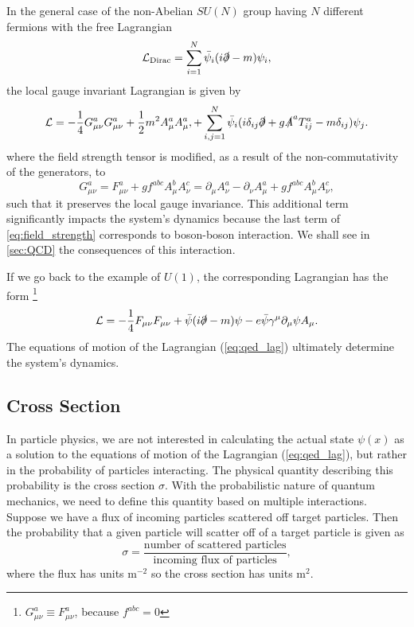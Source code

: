 In the general case of the non-Abelian $SU(N)$ group having $N$ different fermions with the free Lagrangian
\begin{equation}
    \label{eq:Dirac_N}
    \mathcal{L}_{\text{Dirac}} = \sum_{i=1}^N \bar{\psi}_i (i\slashed{\partial} - m) \psi_i,
\end{equation}
the local gauge invariant Lagrangian is given by \cite{schartz}
\begin{equation}
    \label{eq:lag_suN}
    \mathcal{L} = - \frac{1}{4}  G^a_{\mu\nu} G^a_{\mu\nu} + \frac{1}{2} m^2 A^a_\mu A^a_\mu, + \sum_{i,j=1}^N \bar{\psi}_i (i\delta_{ij} \slashed{\partial}  +g \slashed{A}^a T^a_{ij} - m \delta_{ij}) \psi_j.
\end{equation}
where the field strength tensor is modified, as a result of the non-commutativity of the generators, to
\begin{equation}
    \label{eq:field_strength}
    G^a_{\mu\nu} = F^a_{\mu\nu} + g f^{abc} A^b_\mu A^c_\nu = \partial_\mu A^a_\nu - \partial_\nu A^a_\mu + g f^{abc} A^b_\mu A^c_\nu,
\end{equation}
such that it preserves the local gauge invariance.
This additional term significantly impacts the system's dynamics because the last term of \ref{eq:field_strength} corresponds to boson-boson interaction.
We shall see in \cref{sec:QCD} the consequences of this interaction.

If we go back to the example of $U(1)$, the corresponding Lagrangian has the form \footnote{$G^a_{\mu\nu} \equiv F^a_{\mu\nu}$, because $f^{abc} = 0$}
\begin{equation}
    \label{eq:qed_lag}
    \mathcal{L} = - \frac{1}{4}  F_{\mu\nu} F_{\mu\nu} + \bar{\psi}(i\slashed{\partial} - m) \psi - e \bar{\psi} \gamma^\mu \partial_\mu \psi A_\mu.
\end{equation}
The equations of motion of the Lagrangian (\ref{eq:qed_lag}) ultimately determine the system's dynamics.

\subsection{Cross Section}
\label{sec:cross_section}
In particle physics, we are not interested in calculating the actual state $\psi(x)$ as a solution to the equations of motion of the Lagrangian (\ref{eq:qed_lag}), but rather in the probability of particles interacting. 
The physical quantity describing this probability is the cross section $\sigma$.
With the probabilistic nature of quantum mechanics, we need to define this quantity based on multiple interactions.
Suppose we have a flux of incoming particles scattered off target particles. 
Then the probability that a given particle will scatter off of a target particle is given as 
\begin{equation}
    \label{eq:cross_sec}
    \sigma = \frac{\text{number of scattered particles}}{\text{incoming flux of particles}},
\end{equation}
where the flux has units m$^{-2}$ so the cross section has units m$^{2}$.

